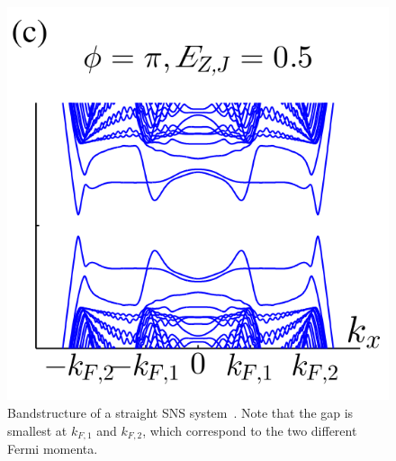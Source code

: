 		\begin{figure}[!htb]
		\centering
		\includegraphics[width=0.5\columnwidth]{figures/pientka_bandstructure}
		\caption{Bandstructure of a straight SNS system~\cite{pientka_topological_2017}.
		Note that the gap is smallest at $k_{F,1}$ and $k_{F,2}$, which correspond to the two different Fermi momenta.}
		\label{fig:pientka_bandstructure}
		\end{figure}